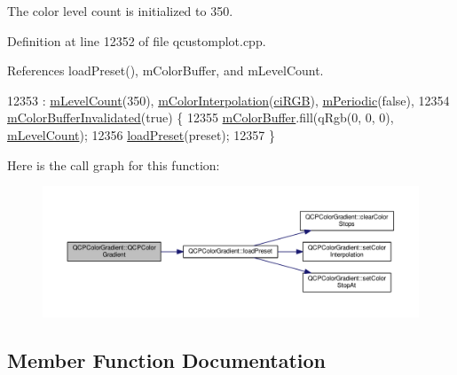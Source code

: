The color level count is initialized to 350. 

Definition at line 12352 of file qcustomplot.\+cpp.



References load\+Preset(), m\+Color\+Buffer, and m\+Level\+Count.


\begin{DoxyCode}
12353     : \hyperlink{class_q_c_p_color_gradient_a98fb68e359904b2c991fcae3e38a211a}{mLevelCount}(350), \hyperlink{class_q_c_p_color_gradient_a028cef73d863800a9ee93ffd641cce01}{mColorInterpolation}(\hyperlink{class_q_c_p_color_gradient_ac5dca17cc24336e6ca176610e7f77fc1a5e30f725c9cfe93999e268a9f92afbe7}{ciRGB}), 
      \hyperlink{class_q_c_p_color_gradient_a4b07deeb20ca1ee2d5ea7e01bf0420af}{mPeriodic}(\textcolor{keyword}{false}),
12354       \hyperlink{class_q_c_p_color_gradient_abacf55e11f67d6722a687af1bb2687bd}{mColorBufferInvalidated}(\textcolor{keyword}{true}) \{
12355   \hyperlink{class_q_c_p_color_gradient_af8b5f0739faa5f8295154d47ce38ecff}{mColorBuffer}.fill(qRgb(0, 0, 0), \hyperlink{class_q_c_p_color_gradient_a98fb68e359904b2c991fcae3e38a211a}{mLevelCount});
12356   \hyperlink{class_q_c_p_color_gradient_aa0aeec1528241728b9671bf8e60b1622}{loadPreset}(preset);
12357 \}
\end{DoxyCode}


Here is the call graph for this function\+:\nopagebreak
\begin{figure}[H]
\begin{center}
\leavevmode
\includegraphics[width=350pt]{class_q_c_p_color_gradient_a546e44df5fa1846400a582c041361c85_cgraph}
\end{center}
\end{figure}




\subsection{Member Function Documentation}
\hypertarget{class_q_c_p_color_gradient_a939213e85f0d1279519d555c5fcfb6ad}{}
